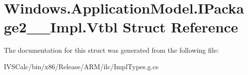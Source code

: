 \hypertarget{struct_windows_1_1_application_model_1_1_i_package2_____impl_1_1_vtbl}{}\section{Windows.\+Application\+Model.\+I\+Package2\+\_\+\+\_\+\+Impl.\+Vtbl Struct Reference}
\label{struct_windows_1_1_application_model_1_1_i_package2_____impl_1_1_vtbl}


The documentation for this struct was generated from the following file\+:\begin{DoxyCompactItemize}
\item 
I\+V\+S\+Calc/bin/x86/\+Release/\+A\+R\+M/ilc/Impl\+Types.\+g.\+cs\end{DoxyCompactItemize}

